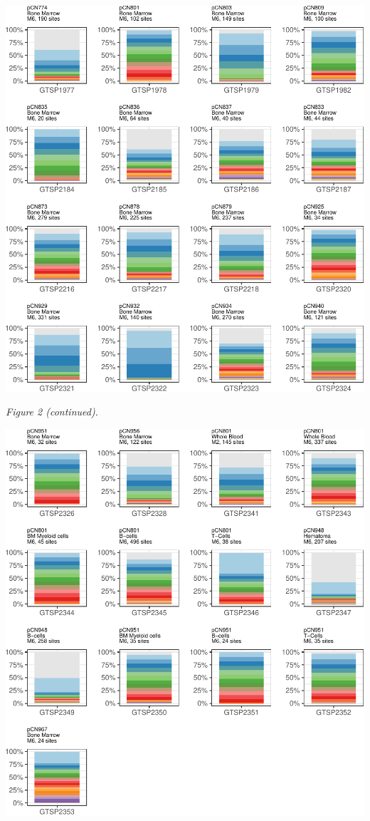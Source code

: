 \documentclass[12pt,]{article}
\begin{document}
\includegraphics{project.group2_files/figure-latex/unnamed-chunk-3-1.pdf}

\newpage

\emph{Figure 2 (continued).}

\vspace{0.50cm}

\includegraphics{project.group2_files/figure-latex/unnamed-chunk-4-1.pdf}
\end{document}
